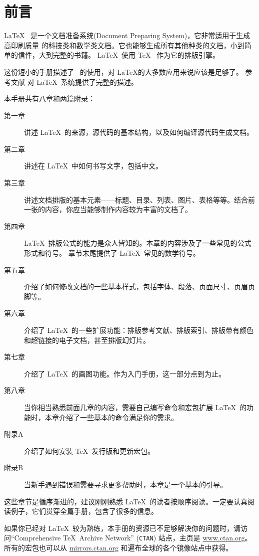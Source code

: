 \chapter{前言}

\LaTeX\ \cite{manual} 是一个文档准备系统(Document Preparing System)，它非常适用于生成高印刷质量
的科技类和数学类文档。它也能够生成所有其他种类的文档，小到简单的信件，大到完整的书籍。
\LaTeX~使用 \TeX\ \cite{texbook} 作为它的排版引擎。%

这份短小的手册描述了 \LaTeXe\ 的使用，对 \LaTeX 的大多数应用来说应该是足够了。
参考文献 \cite{manual,companion} 对 \LaTeX\ 系统提供了完整的描述。%

\bigskip

本手册共有八章和两篇附录：%
\begin{description}%
\item[第一章] 讲述 \LaTeX\ 的来源，源代码的基本结构，以及如何编译源代码生成文档。
\item[第二章] 讲述在 \LaTeX\ 中如何书写文字，包括中文。%
\item[第三章] 讲述文档排版的基本元素——标题、目录、列表、图片、表格等等。结合前一张的内容，你应当能够制作内容较为丰富的文档了。%
\item[第四章] \LaTeX\ 排版公式的能力是众人皆知的。本章的内容涉及了一些常见的公式形式和符号。
              章节末尾提供了 \LaTeX\ 常见的数学符号。%
\item[第五章] 介绍了如何修改文档的一些基本样式，包括字体、段落、页面尺寸、页眉页脚等。
\item[第六章] 介绍了 \LaTeX\ 的一些扩展功能：排版参考文献、排版索引、排版带有颜色和超链接的电子文档，甚至排版幻灯片。
\item[第七章] 介绍了 \LaTeX\ 的画图功能。作为入门手册，这一部分点到为止。
\item[第八章] 当你相当熟悉前面几章的内容，需要自己编写命令和宏包扩展 \LaTeX\ 的功能时，本章介绍了一些基本的命令满足你的需求。
\end{description}%
\begin{description}
\item[附录A] 介绍了如何安装 \TeX\ 发行版和更新宏包。
\item[附录B] 当新手遇到错误和需要寻求更多帮助时，本章是一个基本的引导。
\end{description}

\bigskip
这些章节是循序渐进的，建议刚刚熟悉 \LaTeX\ 的读者按顺序阅读。一定要认真阅读例子，它们贯穿全篇手册，包含了很多的信息。%

\bigskip
如果你已经对 \LaTeX\ 较为熟练，本手册的资源已不足够解决你的问题时，请访问``Comprehensive
\TeX\ Archive Network'' (\texttt{CTAN}) 站点，主页是 \url{www.ctan.org}。
所有的宏包也可以从 \url{mirrors.ctan.org} 和遍布全球的各个镜像站点中获得。

